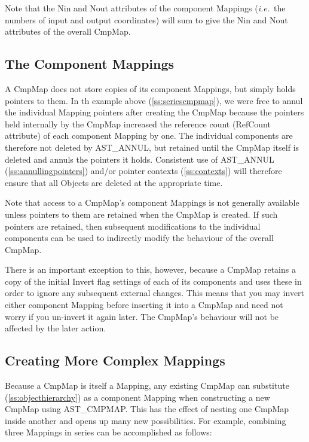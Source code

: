 \documentclass[twoside,11pt]{article}
\newcommand{\htmlref}[2]{#1}
\newcommand{\secref}[1]{\S\ref{#1}}
\renewcommand{\secref}[1]{\ref{#1}}
\begin{document}
Note that the \htmlref{Nin}{Nin} and \htmlref{Nout}{Nout} attributes of the component Mappings
({\em{i.e.}}\ the numbers of input and output coordinates) will sum to
give the Nin and Nout attributes of the overall CmpMap.

\subsection{\label{ss:cmpmapcomponents}The Component Mappings}

A \htmlref{CmpMap}{CmpMap} does not store copies of its component Mappings, but simply
holds pointers to them. In th example above (\secref{ss:seriescmpmap}),
we were free to annul the individual \htmlref{Mapping}{Mapping} pointers after creating
the CmpMap because the pointers held internally by the CmpMap
increased the reference count (\htmlref{RefCount}{RefCount} attribute) of each component
Mapping by one. The individual components are therefore not deleted by
\htmlref{AST\_ANNUL}{AST_ANNUL}, but retained until the CmpMap itself is deleted and annuls
the pointers it holds. Consistent use of AST\_ANNUL
(\secref{ss:annullingpointers}) and/or pointer contexts
(\secref{ss:contexts}) will therefore ensure that all Objects are
deleted at the appropriate time.

Note that access to a CmpMap's component Mappings is not generally
available unless pointers to them are retained when the CmpMap is
created. If such pointers are retained, then subsequent modifications
to the individual components can be used to indirectly modify the
behaviour of the overall CmpMap.

There is an important exception to this, however, because a CmpMap
retains a copy of the initial \htmlref{Invert}{Invert} flag settings of each of its
components and uses these in order to ignore any subsequent external
changes. This means that you may invert either component Mapping
before inserting it into a CmpMap and need not worry if you un-invert
it again later. The CmpMap's behaviour will not be affected by the
later action.

\subsection{\label{ss:complexcmpmap}Creating More Complex Mappings}

Because a \htmlref{CmpMap}{CmpMap} is itself a \htmlref{Mapping}{Mapping}, any existing CmpMap can
substitute (\secref{ss:objecthierarchy}) as a component Mapping when
constructing a new CmpMap using \htmlref{AST\_CMPMAP}{AST_CMPMAP}. This has the effect of
nesting one CmpMap inside another and opens up many new possibilities.
For example, combining three Mappings in series can be accomplished as
follows:
\end{document}
